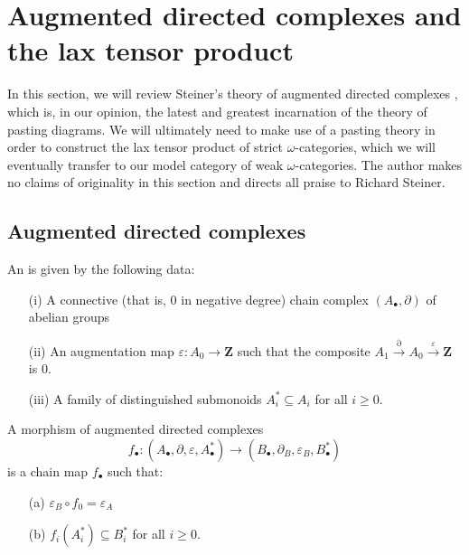 \section{Augmented directed complexes and the lax tensor product}
In this section, we will review Steiner's theory of augmented directed complexes \cite{steinerchain}, which is, in our opinion, the latest and greatest incarnation of the theory of pasting diagrams.  We will ultimately need to make use of a pasting theory in order to construct the lax tensor product of strict \(\omega\)-categories, which we will eventually transfer to our model category of weak \(\omega\)-categories.  The author makes no claims of originality in this section and directs all praise to Richard Steiner.
\subsection{Augmented directed complexes}
\begin{defn} An  is given by the following data:
\begin{enumerate}
\item[(i)] A connective (that is, \(0\) in negative degree) chain complex \((A_\bullet, \partial)\) of abelian groups
\item[(ii)] An augmentation map \(\varepsilon: A_0 \to \mathbf{Z}\) such that the composite \(A_1\xrightarrow{\partial}A_0 \xrightarrow{\varepsilon} \mathbf{Z}\) is \(0\).
\item[(iii)] A family of distinguished submonoids \(A^\ast_i\subseteq A_i\) for all \(i\geq 0\).
\end{enumerate}
A morphism of augmented directed complexes \[f_\bullet: (A_\bullet, \partial, \varepsilon, A^\ast_\bullet) \to (B_\bullet, \partial_B, \varepsilon_B, B^\ast_\bullet)\] is a chain map \(f_\bullet\) such that:
\begin{enumerate}
\item[(a)] \(\varepsilon_B \circ f_0 = \varepsilon_A\)
\item[(b)] \(f_i(A^\ast_i)\subseteq B^\ast_i\) for all \(i\geq 0\).  
\end{enumerate}
\end{defn}

